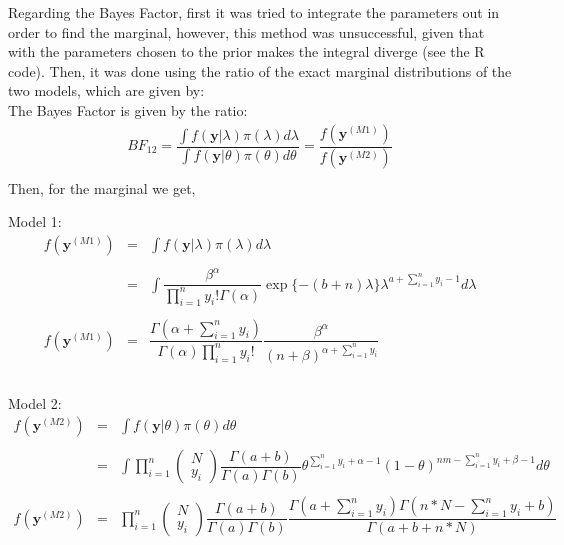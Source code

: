 \documentclass[a4paper, 11pt]{article}
\begin{document}
Regarding the Bayes Factor, first it was tried to integrate the parameters out in order to find the marginal, however, this method was unsuccessful, given that with the parameters chosen to the prior makes the integral diverge (see the R code). Then, it was done using the ratio of the exact marginal distributions of the two models, which are given by: \\

\noindent
The Bayes Factor is given by the ratio:
\begin{equation*}
\begin{array}{lclll}
BF_{12} = \dfrac{ \int f(\textbf{y}|\lambda) \pi(\lambda) d\lambda}{\int f(\textbf{y}|\theta) \pi(\theta) d\theta} = \dfrac{f(\textbf{y}^{(M1)})}{f(\textbf{y}^{(M2)})} \\
\end{array}
\end{equation*}
Then, for the marginal we get,

\noindent
Model 1:
\begin{equation*}
\begin{array}{lclll}
f(\textbf{y}^{(M1)}) & = & \int f(\textbf{y}|\lambda) \pi(\lambda) d\lambda
\\ \\
 & = & \displaystyle\int  \dfrac{\beta^\alpha}{\prod_{i=1}^{n}y_i!\Gamma(\alpha)} \exp\{ -(b + n)\lambda\}\lambda^{a + \sum_{i=1}^{n}y_i -1} d\lambda \\ \\
 
f(\textbf{y}^{(M1)}) & = &  \dfrac{\Gamma(\alpha + \sum_{i=1}^{n}y_i)}{\Gamma(\alpha)\prod_{i=1}^{n}y_i!} \dfrac{\beta^\alpha}{(n+\beta)^{\alpha + \sum_{i=1}^{n}y_i}} \\ \\
\end{array}
\end{equation*}

\noindent
Model 2:
\begin{equation*}
\begin{array}{lclll}
f(\textbf{y}^{(M2)}) & = & \int f(\textbf{y}|\theta) \pi(\theta) d\theta
\\ \\
 & = & \displaystyle\int \displaystyle\prod_{i=1}^{n} \left(
    \begin{array}{c}
     N \\
     y_i  
    \end{array}
        \right) \dfrac{\Gamma(a + b)}{\Gamma(a)\Gamma(b)} \theta^{\sum_{i=1}^{n}y_i + \alpha -1} (1 - \theta)^{nm - \sum_{i=1}^{n}y_i + \beta -1} d\theta \\\\
        
f(\textbf{y}^{(M2)}) & = & \displaystyle\prod_{i=1}^{n} \left(
    \begin{array}{c}
     N \\
     y_i  
    \end{array}
        \right) \dfrac{\Gamma(a + b)}{\Gamma(a)\Gamma(b)} \dfrac{\Gamma(a + \sum_{i=1}^{n}y_i) \Gamma(n*N - \sum_{i=1}^{n}y_i + b)}{\Gamma(a + b + n*N)} \\
\end{array}
\end{equation*}
\end{document}
